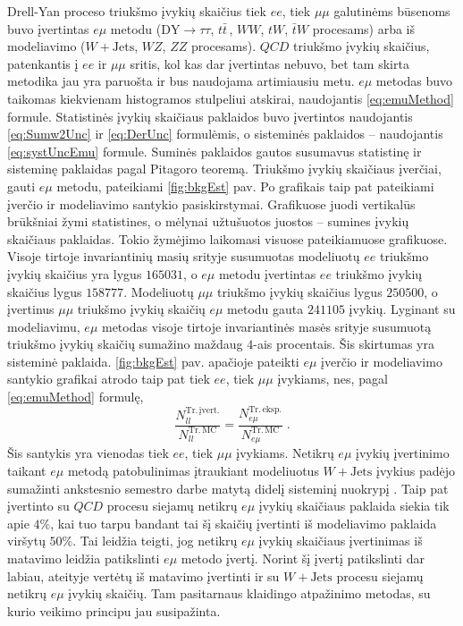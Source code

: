 \documentclass[a4paper, 12pt, oneside]{article}
\newcommand{\emu}{e\mu}
\newcommand{\mumu}{\mu\mu}
\newcommand{\WJets}{W\! +\!\mathrm{Jets}}
\newcommand{\DYtau}{\mathrm{DY} \! \rightarrow \! \tau\tau}
\newcommand{\QCD}{QC\! D}
\newlength\q
\begin{document}
Drell-Yan proceso triukšmo įvykių skaičius tiek $ee$, tiek $\mumu$ galutinėms būsenoms buvo įvertintas $\emu$
metodu ($\DYtau$, $t\bar{t}\,$, $WW$, $tW$, $\bar{t}W$ procesams) arba iš modeliavimo ($W+\mathrm{Jets}$, $WZ$,
$ZZ$ procesams).
$QCD$ triukšmo įvykių skaičius, patenkantis į $ee$ ir $\mu\mu$ sritis, kol kas dar įvertintas nebuvo, bet tam skirta metodika
jau yra paruošta ir bus naudojama artimiausiu metu.
$\emu$ metodas buvo taikomas kiekvienam histogramos stulpeliui atskirai, naudojantis \eqref{eq:emuMethod} formule.
Statistinės įvykių skaičiaus paklaidos buvo įvertintos naudojantis \eqref{eq:Sumw2Unc} ir \eqref{eq:DerUnc}
formulėmis, o sisteminės paklaidos -- naudojantis \eqref{eq:systUncEmu} formule.
Suminės paklaidos gautos susumavus statistinę ir sisteminę paklaidas pagal Pitagoro teoremą.
Triukšmo įvykių skaičiaus įverčiai, gauti $\emu$ metodu, pateikiami \ref{fig:bkgEst} pav.
Po grafikais taip pat pateikiami įverčio ir modeliavimo santykio pasiskirstymai.
Grafikuose juodi vertikalūs brūkšniai žymi statistines, o mėlynai užtušuotos juostos -- sumines įvykių skaičiaus paklaidas.
Tokio žymėjimo laikomasi visuose pateikiamuose grafikuose.
Visoje tirtoje invariantinių masių srityje susumuotas modeliuotų $ee$ triukšmo įvykių skaičius yra lygus $165031$,
o $e\mu$ metodu įvertintas $ee$ triukšmo įvykių skaičius lygus $158777$.
Modeliuotų $\mu\mu$ triukšmo įvykių skaičius lygus $250500$, o įvertinus $\mu\mu$ triukšmo įvykių skaičių  $e\mu$ metodu
gauta $241105$ įvykių.
Lyginant su modeliavimu, $\emu$ metodas visoje tirtoje invariantinės masės srityje susumuotą triukšmo įvykių skaičių
sumažino maždaug $4$-ais procentais.
Šis skirtumas yra sisteminė paklaida.
\ref{fig:bkgEst} pav. apačioje pateikti $\emu$ įverčio ir modeliavimo santykio grafikai atrodo taip pat
tiek $ee$, tiek $\mu\mu$ įvykiams, nes, pagal \eqref{eq:emuMethod} formulę,
$$\frac{N_{ll}^{\mathrm{Tr. \, įvert.}}}{N_{ll}^{\mathrm{Tr. \, MC}}} =
\frac{N_{\emu}^{\mathrm{Tr. \, eksp.}}}{N_{\emu}^{\mathrm{Tr. \, MC}}} \; .$$
Šis santykis yra vienodas tiek $ee$, tiek $\mu\mu$ įvykiams.
Netikrų $\emu$ įvykių įvertinimo taikant $\emu$ metodą patobulinimas įtraukiant modeliuotus $\WJets$ įvykius padėjo
sumažinti ankstesnio semestro darbe matytą didelį sisteminį nuokrypį \cite{MAk1}.
Taip pat įvertinto su $\QCD$ procesu siejamų netikrų $\emu$ įvykių skaičiaus paklaida siekia tik apie $4\%$, kai tuo tarpu
bandant tai šį skaičių įvertinti iš modeliavimo paklaida viršytų $50\%$.
Tai leidžia teigti, jog netikrų $\emu$ įvykių skaičiaus įvertinimas iš matavimo leidžia patikslinti $\emu$ metodo įvertį.
Norint šį įvertį patikslinti dar labiau, ateityje vertėtų iš matavimo įvertinti ir su $\WJets$ procesu siejamų netikrų $\emu$ įvykių skaičių.
Tam pasitarnaus klaidingo atpažinimo metodas, su kurio veikimo principu jau susipažinta.
\end{document}
